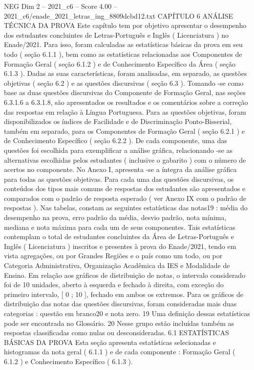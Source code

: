 \begin{textsample}{NEG Dim 2 – 2021\_c6 – Score 4.00 – 2021\_c6/enade\_2021\_letras\_ing\_8809dcbd12.txt}  \label{ex:f2_neg_261}
CAPÍTULO 6 ANÁLISE TÉCNICA DA PROVA Este capítulo tem por objetivo apresentar o desempenho dos estudantes concluintes de Letras-Português e Inglês ( Licenciatura ) no Enade/2021.
Para isso, foram calculadas as estatísticas básicas da prova em seu todo ( seção 6.1.1 ), bem como as estatísticas relacionadas aos Componentes de Formação Geral ( seção 6.1.2 ) e de Conhecimento Específico da Área ( seção 6.1.3 ).
Dadas as suas características, foram analisadas, em separado, as questões objetivas ( seção 6.2 ) e as questões discursivas ( seção 6.3 ).
Tomando -se como base as duas questões discursivas do Componente de Formação Geral, nas seções 6.3.1.6 a 6.3.1.8, são apresentados os resultados e os comentários sobre a correção das respostas em relação à Língua Portuguesa.
Para as questões objetivas, foram disponibilizados os índices de Facilidade e de Discriminação Ponto-Bisserial, também em separado, para os Componentes de Formação Geral ( seção 6.2.1 ) e de Conhecimento Específico ( seção 6.2.2 ).
De cada componente, uma das questões foi escolhida para exemplificar a análise gráfica, relacionando -se as alternativas escolhidas pelos estudantes ( inclusive o gabarito ) com o número de acertos no componente.
No Anexo I, apresenta -se a íntegra da análise gráfica para todas as questões objetivas.
Para cada uma das questões discursivas, os conteúdos dos tipos mais comuns de respostas dos estudantes são apresentados e comparados com o padrão de resposta esperado ( ver Anexo IX com o padrão de respostas ).
Nas tabelas, constam as seguintes estatísticas das notas19 : média do desempenho na prova, erro padrão da média, desvio padrão, nota mínima, mediana e nota máxima para cada um de seus componentes.
Tais estatísticas contemplam o total de estudantes concluintes da Área de Letras-Português e Inglês ( Licenciatura ) inscritos e presentes à prova do Enade/2021, tendo em vista agregações, ou por Grandes Regiões e o país como um todo, ou por Categoria Administrativa, Organização Acadêmica da IES e Modalidade de Ensino.
Em relação aos gráficos de distribuição de notas, o intervalo considerado foi de 10 unidades, aberto à esquerda e fechado à direita, com exceção do primeiro intervalo, [ 0 ; 10 ], fechado em ambos os extremos.
Para os gráficos de distribuição das notas das questões discursivas, foram consideradas mais duas categorias : questão em branco20 e nota zero. 19 Uma definição dessas estatísticas pode ser encontrada no Glossário. 20 Nesse grupo estão incluídas também as respostas classificadas como nulas ou desconsideradas. 6.1 ESTATÍSTICAS BÁSICAS DA PROVA Esta seção apresenta estatísticas selecionadas e histogramas da nota geral ( 6.1.1 ) e de cada componente : Formação Geral ( 6.1.2 ) e Conhecimento Específico ( 6.1.3 ).

\end{textsample}
